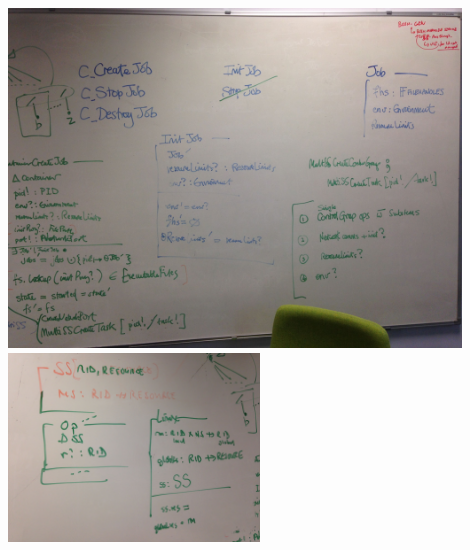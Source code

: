 \documentclass[a4paper,twoside,12pt]{article}
\begin{document}
\includegraphics[width=0.9\textwidth]{pics/IMG_0691.jpg}\\
\includegraphics[width=0.5\textwidth]{pics/IMG_0692.jpg}\\



\clearpage

\appendix


\end{document}

